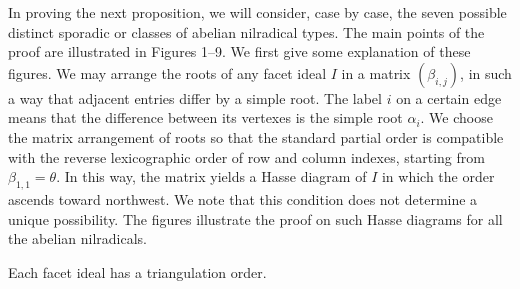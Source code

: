 \documentclass[ALCO,published]{cedram}
\theoremstyle{plain}
\newcommand\al{\alpha}
\newcommand\be{\beta}
\begin{document}
\par
In proving the next proposition, we will consider, case by case, the seven possible distinct sporadic or classes of abelian nilradical types.  
The main points of the proof are illustrated in Figures 1--9. 
We first give some explanation of these figures. 
We may arrange the roots of any facet ideal $I$ in a matrix $(\be_{i,j})$, in such a way that adjacent entries differ by a simple root. 
The label $i$ on a certain edge means that  the difference between its vertexes is the simple root $\al_i$. 
We choose the matrix arrangement of roots so that the standard partial order is compatible with the reverse lexicographic order of row and column indexes, starting from $\be_{1,1}=\theta$.
In this way, the matrix yields a Hasse diagram of $I$ in which  the order ascends toward northwest. 
We note that this condition does not determine a unique possibility. 
The figures illustrate  the proof on such Hasse diagrams for all the abelian nilradicals.

\begin{pro}\label{pro:tri-ord-existence}
Each facet ideal has a triangulation order.
\end{pro}
\end{document}
